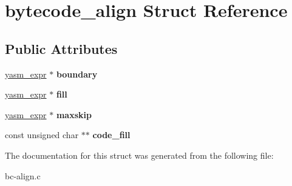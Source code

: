 \hypertarget{structbytecode__align}{\section{bytecode\-\_\-align Struct Reference}
\label{structbytecode__align}
}
\subsection*{Public Attributes}
\begin{DoxyCompactItemize}
\item 
\hypertarget{structbytecode__align_a3afe8b4abcaffa7499e4162746a7cacf}{\hyperlink{structyasm__expr}{yasm\-\_\-expr} $\ast$ {\bfseries boundary}}\label{structbytecode__align_a3afe8b4abcaffa7499e4162746a7cacf}

\item 
\hypertarget{structbytecode__align_a3db2090c3fe27b178708148b98de926f}{\hyperlink{structyasm__expr}{yasm\-\_\-expr} $\ast$ {\bfseries fill}}\label{structbytecode__align_a3db2090c3fe27b178708148b98de926f}

\item 
\hypertarget{structbytecode__align_a2b93bc2b9b582e18a10d3895bc0246b0}{\hyperlink{structyasm__expr}{yasm\-\_\-expr} $\ast$ {\bfseries maxskip}}\label{structbytecode__align_a2b93bc2b9b582e18a10d3895bc0246b0}

\item 
\hypertarget{structbytecode__align_ab9c95fab7786fb6a77bf373c01a731de}{const unsigned char $\ast$$\ast$ {\bfseries code\-\_\-fill}}\label{structbytecode__align_ab9c95fab7786fb6a77bf373c01a731de}

\end{DoxyCompactItemize}


The documentation for this struct was generated from the following file\-:\begin{DoxyCompactItemize}
\item 
bc-\/align.\-c\end{DoxyCompactItemize}
